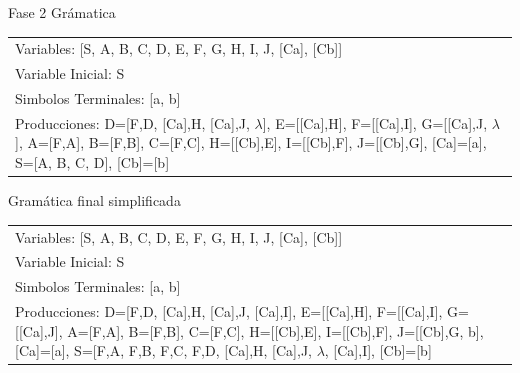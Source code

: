 \documentclass[a4paper,11pt]{article}
\newcommand{\MYp}[1]{ {\color[rgb]{0.392,0.392,0.392}#1} }
\begin{document}
\MYp{\Huge Fase 2}
\newline
\MYp{\Huge Gr\'amatica}
\newline
\begin{center}\begin{tabular}{ m{15cm} }


Variables: [S, A, B, C, D, E, F, G, H, I, J, [Ca], [Cb]] \\
Variable Inicial: S \\
Simbolos Terminales: [a, b] \\
Producciones: {D=[F,D, [Ca],H, [Ca],J, $\lambda$], E=[[Ca],H], F=[[Ca],I], G=[[Ca],J, $\lambda$], A=[F,A], B=[F,B], C=[F,C], H=[[Cb],E], I=[[Cb],F], J=[[Cb],G], [Ca]=[a], S=[A, B, C, D], [Cb]=[b]} \\

\end{tabular}
\end{center}
\MYp{\Huge Gram\'{a}tica final simplificada}
\newline
\begin{center}\begin{tabular}{ m{15cm} }


Variables: [S, A, B, C, D, E, F, G, H, I, J, [Ca], [Cb]] \\
Variable Inicial: S \\
Simbolos Terminales: [a, b] \\
Producciones: {D=[F,D, [Ca],H, [Ca],J, [Ca],I], E=[[Ca],H], F=[[Ca],I], G=[[Ca],J], A=[F,A], B=[F,B], C=[F,C], H=[[Cb],E], I=[[Cb],F], J=[[Cb],G, b], [Ca]=[a], S=[F,A, F,B, F,C, F,D, [Ca],H, [Ca],J, $\lambda$, [Ca],I], [Cb]=[b]} \\

\end{tabular}
\end{center}
\end{document}
